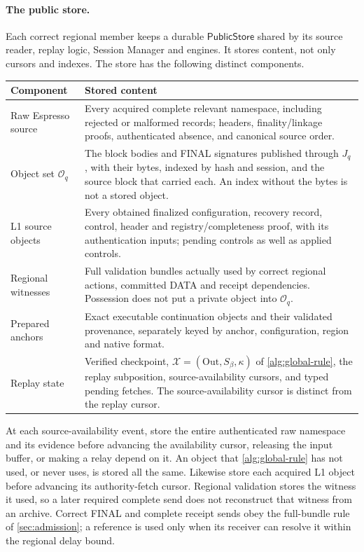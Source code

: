 \documentclass[11pt,a4paper]{article}
\newcommand{\tagg}[1]{\ensuremath{\mathsf{#1}}}
\begin{document}
\paragraph{The public store.}
Each correct regional member keeps a durable \tagg{PublicStore} shared
by its source reader, replay logic, Session Manager and engines. It stores content, not only cursors and indexes. The store
has the following distinct components.
\begin{table}[htbp]\centering\small
\begin{tabularx}{\linewidth}{@{}>{\raggedright\arraybackslash}p{.24\linewidth}Y@{}}\toprule
Component & Stored content\\\midrule
Raw Espresso source & Every acquired complete relevant namespace,
including rejected or malformed records; headers, finality/linkage
proofs, authenticated absence, and canonical source order.\\
Object set $\mathcal O_q$ & The block bodies and FINAL signatures
published through $J_q$, with their bytes, indexed by hash and session,
and the source block that carried each. An index without the bytes is
not a stored object.\\
L1 source objects & Every obtained finalized configuration, recovery record, control,
header and registry/completeness proof, with its authentication inputs;
pending controls as well as applied controls.\\
Regional witnesses & Full validation bundles actually used by correct
regional actions, committed DATA and receipt dependencies. Possession
does not put a private object into $\mathcal O_q$.\\
Prepared anchors & Exact executable continuation objects and their
validated provenance, separately keyed by anchor, configuration,
region and native format.\\
Replay state & Verified checkpoint,
$\mathcal X=(\mathrm{Out},S_\beta,\kappa)$ of \cref{alg:global-rule}, the replay subposition,
source-availability cursors, and typed pending fetches.
The source-availability cursor is distinct from the replay cursor.\\\bottomrule
\end{tabularx}
\end{table}

At each source-availability event, store the entire authenticated raw
namespace and its evidence before advancing the availability cursor,
releasing the input buffer, or making a relay depend on it. An object
that \cref{alg:global-rule} has not used, or never uses, is stored all
the same. Likewise store each acquired L1
object before advancing its authority-fetch cursor. Regional validation
stores the witness it used, so a later required complete send does not
reconstruct that witness from an archive. Correct FINAL and complete
receipt sends obey the full-bundle rule of \cref{sec:admission}; a
reference is used only when its receiver can resolve it within the
regional delay bound.
\end{document}
